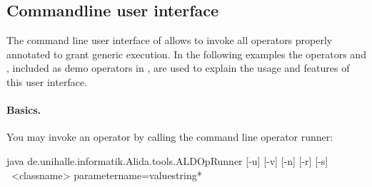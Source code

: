 \subsection{Commandline user interface}
\label{subsec:userCmdline}


The command line user interface of \alida allows to invoke all \alida operators
properly annotated to grant generic execution.
In the following examples the operators 
and ,
included as demo operators in \alida, are used to explain the usage and
features of this user interface.

\paragraph{Basics.}

You may invoke an operator by calling the command line operator runner:
\vspace*{0.5cm}
\begin{code}
java de.unihalle.informatik.Alida.tools.ALDOpRunner [-u] [-v] [-n] [-r] [-s] \
	  <classname> {parametername=valuestring}*
\end{code}

